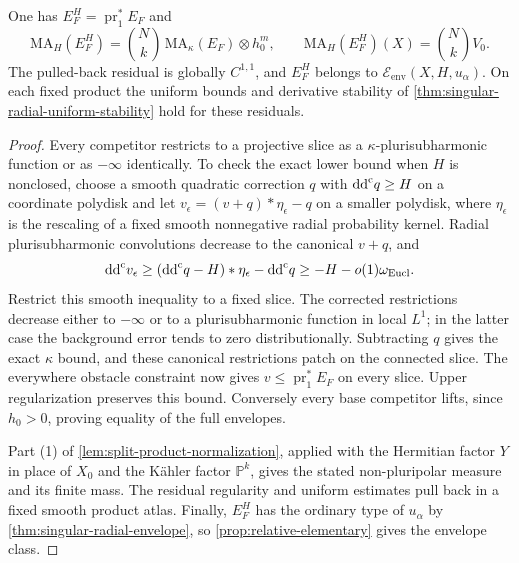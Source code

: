 \begin{proposition}\label{prop:singular-radial-full-product}
One has $E_F^H=\operatorname{pr}_1^*E_F$ and
\[
 \mathrm{MA}_H(E_F^H)=\binom Nk\,\mathrm{MA}_\kappa(E_F)\otimes h_0^m,
 \qquad \mathrm{MA}_H(E_F^H)(X)=\binom Nk V_0.
\]
The pulled-back residual is globally $C^{1,1}$, and $E_F^H$ belongs to
$\mathcal E_{\mathrm{env}}(X,H,u_\alpha)$. On each fixed product the uniform bounds and derivative stability of \cref{thm:singular-radial-uniform-stability} hold for these residuals.
\end{proposition}
\begin{proof}
Every competitor restricts to a projective slice as a $\kappa$-plurisubharmonic function or as $-\infty$ identically. To check the exact lower bound when $H$ is nonclosed, choose a smooth quadratic correction $q$ with $\mathrm{dd}^{\mathrm{c}} q\geq H$ on a coordinate polydisk and let
$v_\epsilon=(v+q)*\eta_\epsilon-q$ on a smaller polydisk, where $\eta_\epsilon$ is the rescaling of a fixed smooth nonnegative radial probability kernel. Radial plurisubharmonic convolutions decrease to the canonical $v+q$, and
\[
 \mathrm{dd}^{\mathrm{c}} v_\epsilon\geq(\mathrm{dd}^{\mathrm{c}} q-H)*\eta_\epsilon-\mathrm{dd}^{\mathrm{c}} q
 \geq-H-o(1)\omega_{\mathrm{Eucl}}.
\]
Restrict this smooth inequality to a fixed slice. The corrected restrictions decrease either to $-\infty$ or to a plurisubharmonic function in local $L^1$; in the latter case the background error tends to zero distributionally. Subtracting $q$ gives the exact $\kappa$ bound, and these canonical restrictions patch on the connected slice. The everywhere obstacle constraint now gives $v\leq\operatorname{pr}_1^*E_F$ on every slice. Upper regularization preserves this bound. Conversely every base competitor lifts, since $h_0>0$, proving equality of the full envelopes.

Part (1) of \cref{lem:split-product-normalization}, applied with the Hermitian factor $Y$ in place of $X_0$ and the K\"ahler factor $\mathbb P^k$, gives the stated non-pluripolar measure and its finite mass. The residual regularity and uniform estimates pull back in a fixed smooth product atlas. Finally, $E_F^H$ has the ordinary type of $u_\alpha$ by \cref{thm:singular-radial-envelope}, so \cref{prop:relative-elementary} gives the envelope class.
\end{proof}

